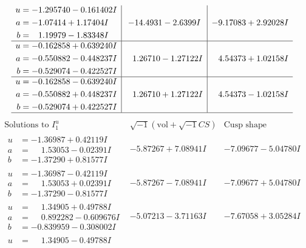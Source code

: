 \documentclass[1p]{elsarticle_modified}
\theoremstyle{definition}
\newcommand{\I}{\sqrt{-1}}
\begin{document}
$$\begin{array}{c|c|c}
\begin{aligned}
u &= -1.295740 - 0.161402 I \\
a &= -1.07414 + 1.17404 I \\
b &= \phantom{-}1.19979 - 1.83348 I\end{aligned}
 & -14.4931 - 2.6399 I & -9.17083 + 2.92028 I \\ \hline\begin{aligned}
u &= -0.162858 + 0.639240 I \\
a &= -0.550882 - 0.448237 I \\
b &= -0.529074 - 0.422527 I\end{aligned}
 & \phantom{-}1.26710 - 1.27122 I & \phantom{-}4.54373 + 1.02158 I \\ \hline\begin{aligned}
u &= -0.162858 - 0.639240 I \\
a &= -0.550882 + 0.448237 I \\
b &= -0.529074 + 0.422527 I\end{aligned}
 & \phantom{-}1.26710 + 1.27122 I & \phantom{-}4.54373 - 1.02158 I\\
 \hline 
 \end{array}$$\newpage$$\begin{array}{c|c|c}  
\text{Solutions to }I^u_{1}& \I (\text{vol} + \sqrt{-1}CS) & \text{Cusp shape}\\
 \hline 
\begin{aligned}
u &= -1.36987 + 0.42119 I \\
a &= \phantom{-}1.53053 - 0.02391 I \\
b &= -1.37290 + 0.81577 I\end{aligned}
 & -5.87267 + 7.08941 I & -7.09677 - 5.04780 I \\ \hline\begin{aligned}
u &= -1.36987 - 0.42119 I \\
a &= \phantom{-}1.53053 + 0.02391 I \\
b &= -1.37290 - 0.81577 I\end{aligned}
 & -5.87267 - 7.08941 I & -7.09677 + 5.04780 I \\ \hline\begin{aligned}
u &= \phantom{-}1.34905 + 0.49788 I \\
a &= \phantom{-}0.892282 - 0.609676 I \\
b &= -0.839959 - 0.308002 I\end{aligned}
 & -5.07213 - 3.71163 I & -7.67058 + 3.05284 I \\ \hline\begin{aligned}
u &= \phantom{-}1.34905 - 0.49788 I \\

\end{aligned}
\end{array}$$
\end{document}
